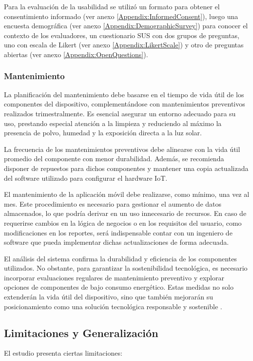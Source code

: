 \documentclass[a4paper,fleqn]{cas-sc}
\begin{document}
				Para la evaluación de la usabilidad se utilizó un formato para obtener el consentimiento informado (ver anexo \ref{Appendix:InformedConsent}), luego una encuesta demográfica (ver anexo \ref{Appendix:DemographicSurvey}) para conocer el contexto de los evaluadores, un cuestionario SUS con dos grupos de preguntas, uno con escala de Likert (ver anexo \ref{Appendix:LikertScale}) y otro de preguntas abiertas (ver anexo \ref{Appendix:OpenQuestions}).
			
			\subsubsection{Mantenimiento}		
				La planificación del mantenimiento debe basarse en el tiempo de vida útil de los componentes del dispositivo, complementándose con mantenimientos preventivos realizados trimestralmente. Es esencial asegurar un entorno adecuado para su uso, prestando especial atención a la limpieza y reduciendo al máximo la presencia de polvo, humedad y la exposición directa a la luz solar.
				
				La frecuencia de los mantenimientos preventivos debe alinearse con la vida útil promedio del componente con menor durabilidad. Además, se recomienda disponer de repuestos para dichos componentes y mantener una copia actualizada del software utilizado para configurar el hardware IoT.
				
				El mantenimiento de la aplicación móvil debe realizarse, como mínimo, una vez al mes. Este procedimiento es necesario para gestionar el aumento de datos almacenados, lo que podría derivar en un uso innecesario de recursos. En caso de requerirse cambios en la lógica de negocios o en los requisitos del usuario, como modificaciones en los reportes, será indispensable contar con un ingeniero de software que pueda implementar dichas actualizaciones de forma adecuada.
				
				El análisis del sistema confirma la durabilidad y eficiencia de los componentes utilizados. No obstante, para garantizar la sostenibilidad tecnológica, es necesario incorporar evaluaciones regulares de mantenimiento preventivo y explorar opciones de componentes de bajo consumo energético. Estas medidas no solo extenderán la vida útil del dispositivo, sino que también mejorarán su posicionamiento como una solución tecnológica responsable y sostenible \citep{Deng2024Does}.
				
		\subsection{Limitaciones y Generalización}
			El estudio presenta ciertas limitaciones:
			
\end{document}
